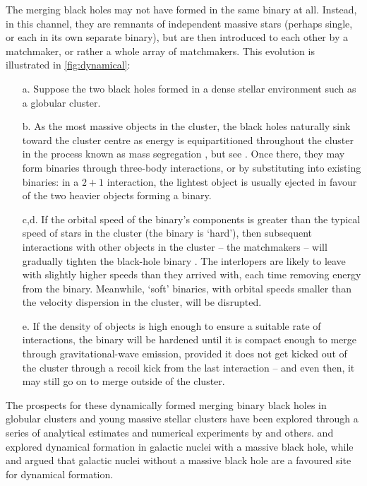 \documentclass[review]{elsarticle}
\begin{document}
The merging black holes may not have formed in the same binary at all.  Instead, in this channel, they are remnants of independent massive stars (perhaps single, or each in its own separate binary), but are then introduced to each other by a matchmaker, or rather a whole array of matchmakers.   This evolution is illustrated in \autoref{fig:dynamical}: 
\begin{enumerate}
\item[a.] Suppose the two black holes formed in a dense stellar environment such as a globular cluster.  
\item[b.] As the most massive objects in the cluster, the black holes naturally sink toward the cluster centre as energy is equipartitioned throughout the cluster in the process known as mass segregation \citep{Spitzer:1969,BinneyTremaine}, but see \citep{Trenti:2013}.  Once there, they may form binaries through three-body interactions, or by substituting into existing binaries: in a $2+1$ interaction, the lightest object is usually ejected in favour of the two heavier objects forming a binary.  
\item[c,d.] If the orbital speed of the binary's components is greater than the typical speed of stars in the cluster (the binary is `hard'), then subsequent interactions with other objects in the cluster -- the matchmakers -- will gradually tighten the black-hole binary \citep{Heggie:1975}. The interlopers are likely to leave with slightly higher speeds than they arrived with, each time removing energy from the binary.   Meanwhile, `soft' binaries, with orbital speeds smaller than the velocity dispersion in the cluster, will be disrupted. 
\item[e.] If the density of objects is high enough to ensure a suitable rate of interactions, the binary will be hardened until it is compact enough to merge through gravitational-wave emission, provided it does not get kicked out of the cluster through a recoil kick from the last interaction -- and even then, it may still go on to merge outside of the cluster.  
\end{enumerate}

The prospects for these dynamically formed merging binary black holes in globular clusters and young massive stellar clusters have been explored through a series of analytical estimates and numerical experiments by \cite{Sigurdsson:1993,Kulkarni:1993,PZwart:2000,OLeary:2006,Banerjee:2010,Downing:2011,Morscher:2015,Rodriguez:2016,Park:2017,FragioneKocsis:2018,Mapelli:2020} and others.  \citet{OLeary:2008} \citep[but see][]{Tsang:2013} and \citet{AntoniniPerets:2012} explored dynamical formation in galactic nuclei with a massive black hole, while \citet{MillerLauburg:2008} and \citet{AntoniniRasio:2016} argued that galactic nuclei without a massive black hole are a favoured site for dynamical formation.  
\end{document}
